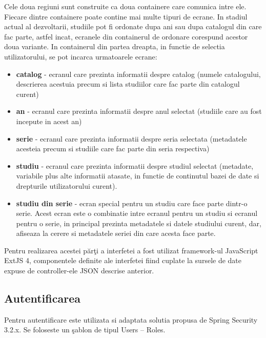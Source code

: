 \documentclass[a4paper, 10pt]{article}
\begin{document}
\medskip

Cele doua regiuni sunt construite ca doua containere care comunica intre ele. Fiecare dintre containere poate contine
mai multe tipuri de ecrane. In stadiul actual al dezvoltarii, studiile pot fi ordonate dupa ani sau dupa catalogul din
care fac parte, astfel incat, ecranele din containerul de ordonare corespund acestor doua variante. In containerul din
partea dreapta, in functie de selectia utilizatorului, se pot incarca urmatoarele ecrane:

\begin{itemize}
\item
{\textbf{catalog}}
- ecranul care prezinta informatii despre catalog (numele catalogului, descrierea acestuia precum si lista
studiilor care fac parte din catalogul curent)
\item
{\textbf{an}}
- ecranul care prezinta informatii despre anul selectat (studiile care au fost incepute in acest an)
\item
{\textbf{serie}}
- ecranul care prezinta informatii despre seria selectata (metadatele acesteia precum si studiile care fac parte
din seria respectiva)
\item 
{\textbf{studiu}}
- ecranul care prezinta informatii despre studiul selectat (metadate, variabile plus alte informatii atasate, in
functie de continutul bazei de date si drepturile utilizatorului curent).
\item
{\textbf{studiu din serie}}
- ecran special pentru un studiu care face parte dintr-o serie. Acest ecran este o combinatie intre
ecranul pentru un studiu si ecranul pentru o serie, in principal prezinta metadatele si datele studiului curent, dar,
afiseaza la cerere si metadatele seriei din care acesta face parte.
\end{itemize}

\medskip

Pentru realizarea acestei p\u{a}r\c{t}i a interfetei a fost utilizat framework-ul JavaScript ExtJS 4,
componentele definite ale interfetei fiind cuplate la sursele de date expuse de controller-ele JSON descrise anterior.

\medskip

\subsection*{Autentificarea}

\medskip

Pentru autentificare este utilizata si adaptata solutia propusa de Spring Security 3.2.x.
Se foloseste un \c{s}ablon de tipul Users -- Roles.
\end{document}
